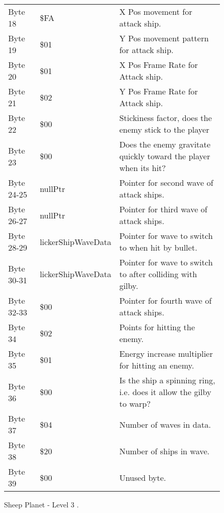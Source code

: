 \begin{figure}[H]
{\begin{adjustbox}{width=12cm}
\begin{tabular}{lll}
 Byte 18    & \$FA                       & X Pos movement for attack ship.                                     \\
 Byte 19    & \$01                       & Y Pos movement pattern for attack ship.                             \\
 Byte 20    & \$01                       & X Pos Frame Rate for Attack ship.                                   \\
 Byte 21    & \$02                       & Y Pos Frame Rate for Attack ship.                                   \\
 Byte 22    & \$00                       & Stickiness factor, does the enemy stick to the player               \\
 Byte 23    & \$00                       & Does the enemy gravitate quickly toward the player when its hit?    \\
 Byte 24-25 & nullPtr                   & Pointer for second wave of attack ships.                            \\
 Byte 26-27 & nullPtr                   & Pointer for third wave of attack ships.                             \\
 Byte 28-29 & lickerShipWaveData        & Pointer for wave to switch to when hit by bullet.                   \\
 Byte 30-31 & lickerShipWaveData        & Pointer for  wave to switch to after colliding with gilby.          \\
 Byte 32-33 & \$00                       & Pointer for fourth wave of attack ships.                            \\
 Byte 34    & \$02                       & Points for hitting the enemy.                                       \\
 Byte 35    & \$01                       & Energy increase multiplier for hitting an enemy.                    \\
 Byte 36    & \$00                       & Is the ship a spinning ring, i.e. does it allow the gilby to warp?  \\
 Byte 37    & \$04                       & Number of waves in data.                                            \\
 Byte 38    & \$20                       & Number of ships in wave.                                            \\
 Byte 39    & \$00                       & Unused byte.                                                        \\
\bottomrule
\end{tabular}

  \end{adjustbox}

  }\caption*{Sheep Planet - Level 3
.}
\end{figure}

